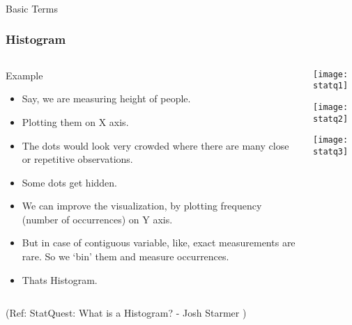 \begin{frame}[fragile]\frametitle{}
\begin{center}
{\Large Basic Terms}
\end{center}
\end{frame}

\begin{frame}[fragile]\frametitle{Histogram}

\begin{columns}
    \begin{column}[T]{0.6\linewidth}
Example
	\begin{itemize}
	\item Say, we are measuring height of people.
	\item Plotting them on X axis.
	\item The dots would look very crowded where there are many close or repetitive observations.
	\item Some dots get hidden.
	\item We can improve the visualization, by plotting frequency (number of occurrences) on Y axis.
	\item But in case of contiguous variable, like, exact measurements are rare. So we `bin' them and measure occurrences.
	\item Thats Histogram.
	\end{itemize}

    \end{column}
    \begin{column}[T]{0.4\linewidth}
      \begin{center}
      \texttt{[image: statq1]}
	  
	  \texttt{[image: statq2]}
	  
	  \texttt{[image: statq3]}	  
	  	\end{center}
    \end{column}

  \end{columns}
  

\tiny{(Ref: StatQuest: What is a Histogram? - Josh Starmer )}
\end{frame}

